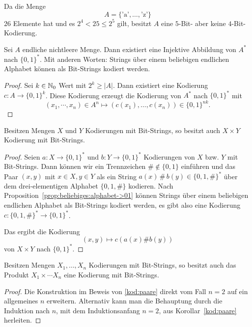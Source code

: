 \begin{bsp}
	Da die Menge 
	\[
		A = \{\text{'a'},\ldots,\text{'z'}\}
	\]
	$26$ Elemente hat und es $2^4 < 25 \le 2^5$ gilt, besitzt $A$ eine $5$-Bit- aber keine $4$-Bit-Kodierung. 
\end{bsp} 

\begin{prop} \label{prop:beliebiges:alphabet->01}
	Sei $A$ endliche nichtleere Menge. Dann existiert eine Injektive Abbildung von $A^\ast$ nach $\{0,1\}^\ast$. Mit anderen Worten: Strings über einem beliebigen endlichen Alphabet können als Bit-Strings kodiert werden. 
\end{prop} 
\begin{proof} 
	Sei $k \in \mathbb{N}_0$ Wert mit $2^k \ge |A|$. Dann existiert eine Kodierung $ c : A \to \{0,1\}^k$. Diese Kodierung erzeugt die Kodierung  von $A^\ast$ nach $\{0,1\}^\ast$ mit
	\[
		(x_1, \cdots ,x_n) \in A^n \mapsto (c(x_1),\ldots,c(x_n)) \in \{0,1\}^{nk}.
	\]
\end{proof} 


\begin{prop} \label{kod:paare}
	Besitzen Mengen $X$ und $Y$ Kodierungen mit Bit-Strings, so besitzt auch $X \times Y$ Kodierung mit Bit-Strings. 
\end{prop} 
\begin{proof}
	Seien $ a : X \to \{0,1\}^\ast$ und $b : Y \to \{0,1\}^\ast$ Kodierungen von $X$ bzw. $Y$ mit Bit-Strings. Dann können wir ein Trennzeichen $\# \not\in \{0,1\}$ einführen und das Paar $(x,y)$ mit $x \in X, y \in Y$ als ein String $a(x) \, \# \,  b(y) \in \{0,1,\#\}^\ast$ über dem drei-elementigen Alphabet $\{0,1,\#\}$ kodieren. Nach Proposition~\ref{prop:beliebiges:alphabet->01} können Strings über einem beliebigen endlichen Alphabet als Bit-Strings kodiert werden, es gibt also eine Kodierung $c : \{0,1,\#\}^\ast \to \{0,1\}^\ast$.

	 Das ergibt die Kodierung 
	 \[
	 		(x,y) \mapsto c ( a(x) \# b(y))
	 \] 
	 von $X \times Y$ nach $\{0,1\}^\ast$. 
\end{proof} 

\begin{kor}
	Besitzen Mengen $X_1,\ldots,X_n$ Kodierungen mit Bit-Strings, so besitzt auch das Produkt $X_1 \times \cdots X_n$ eine Kodierung mit Bit-Strings. 
\end{kor} 
\begin{proof} 
Die Konstruktion im Beweis von \eqref{kod:paare} direkt vom Fall $n=2$ auf ein allgemeines $n$ erweitern. Alternativ kann man die Behauptung durch die Induktion nach $n$, mit dem Induktionsanfang $n=2$, aus Korollar~\ref{kod:paare} herleiten. 
\end{proof} 

